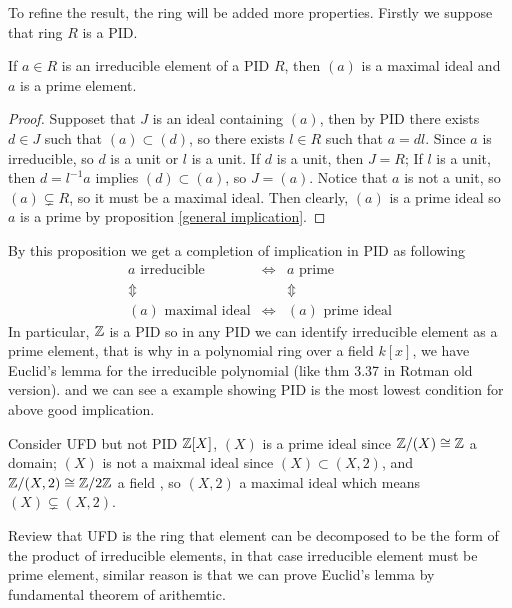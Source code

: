 \documentclass[en,geye,blue,normal,12pt]{elegantnote}
\begin{document}
To refine the result, the ring will be added more properties. Firstly we suppose that ring \(R\) is a PID.
\begin{proposition}
  If \(a \in R\) is an irreducible element of a PID \(R\), then \((a)\) is a maximal ideal and \(a\) is a prime element.
  
  \begin{proof}
    Supposet that \(J\) is an ideal containing \((a)\), then by PID there exists \(d \in J\) such that \((a) \subset (d)\), so there exists \(l \in R\) such that \(a = dl\). Since \(a\) is irreducible, so \(d\) is a unit or \(l\) is a unit. If \(d\) is a unit, then \(J=R\); If \(l\) is a unit, then \(d = l^{-1}a\) implies \((d) \subset (a)\), so \(J=(a)\). Notice that \(a\) is not a unit, so \((a) \subsetneq R\), so it must be a maximal ideal. Then clearly, \((a)\) is a prime ideal so \(a\) is a prime by proposition \ref{general implication}.
  \end{proof}
\end{proposition}

By this proposition we get a completion of implication in PID as following
\[
\begin{array}{ccc}
a \text{ irreducible} & \Leftrightarrow & a \text{ prime} \\
\Updownarrow  &  & \Updownarrow \\
(a) \text{ maximal ideal} & \Leftrightarrow & (a) \text{ prime ideal}
\end{array}
\]
In particular, \(\mathbb{Z}\) is a PID so in any PID we can identify irreducible element as a prime element, that is why in a polynomial ring over a field \(k[x]\), we have Euclid's lemma for the irreducible polynomial (like thm 3.37 in Rotman old version). and we can see a example showing PID is the most lowest condition for above good implication.
\begin{example}
  Consider UFD but not PID \(\mathbb{Z}[X]\), \((X)\) is a prime ideal since \(\mathbb{Z}/(X) \cong \mathbb{Z}\) a domain; \((X)\) is not a maixmal ideal since \((X) \subset (X,2)\), and \(\mathbb{Z}/(X,2) \cong \mathbb{Z}/2\mathbb{Z}\) a field , so \((X,2)\) a maximal ideal which means \((X) \subsetneq (X,2)\).
\end{example}

Review that UFD is the ring that element can be decomposed to be the form of the product of irreducible elements, in that case irreducible element must be prime element, similar reason is that we can prove Euclid's lemma by fundamental theorem of arithemtic.
\end{document}
